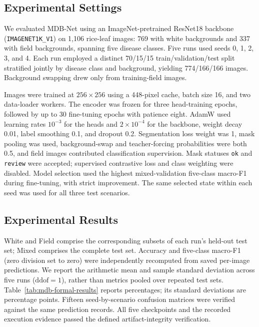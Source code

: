 \subsection{Experimental Settings}
\label{sec:mdb-experimental-settings}
We evaluated MDB-Net using an ImageNet-pretrained ResNet18 backbone
(\texttt{IMAGENET1K\_V1}) on 1,106 rice-leaf images: 769 with white backgrounds
and 337 with field backgrounds, spanning five disease classes.
Five runs used seeds 0, 1, 2, 3, and 4. Each run employed a distinct 70/15/15
train/validation/test split stratified jointly by disease class and background,
yielding 774/166/166 images. Background swapping drew only from training-field images.

Images were trained at $256\times256$ using a 448-pixel cache, batch size 16,
and two data-loader workers. The encoder was frozen for three head-training epochs,
followed by up to 30 fine-tuning epochs with patience eight. AdamW used learning
rates $10^{-3}$ for the heads and $2\times10^{-4}$ for the backbone, weight decay
0.01, label smoothing 0.1, and dropout 0.2. Segmentation loss weight was 1,
mask pooling was used, background-swap and teacher-forcing probabilities were
both 0.5, and field images contributed classification supervision.
Mask statuses \texttt{ok} and \texttt{review} were accepted; supervised contrastive
loss and class weighting were disabled. Model selection used the highest
mixed-validation five-class macro-F1 during fine-tuning, with strict improvement.
The same selected state within each seed was used for all three test scenarios.

\subsection{Experimental Results}
\label{sec:mdb-experimental-results}
White and Field comprise the corresponding subsets of each run's held-out test
set; Mixed comprises the complete test set. Accuracy and five-class macro-F1
(zero division set to zero) were independently recomputed from saved per-image
predictions. We report the arithmetic mean and sample standard deviation across
five runs ($\mathrm{ddof}=1$), rather than metrics pooled over repeated test sets.
Table~\ref{tab:mdb-formal-results} reports percentages; its standard deviations
are percentage points. Fifteen seed-by-scenario confusion matrices were verified
against the same prediction records. All five checkpoints and the recorded
execution evidence passed the defined artifact-integrity verification.

